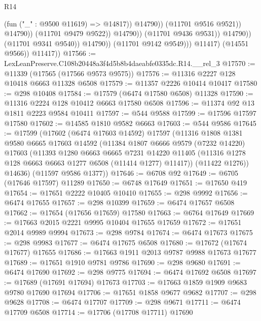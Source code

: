 \begin{lexlean}{R14}
\begin{coremodule}
                                              (fun ("_" : @9500 @11619) => @14817))
                                            @14790))
                                        (@11701 @9516 @9521))
                                      @14790))
                                  (@11701 @9479 @9522))
                                @14790))
                            (@11701 @9436 @9531))
                          @14790))
                      (@11701 @9341 @9540))
                    @14790))
                (@11701 @9142 @9549)))
            @11417)
          (@14551 @9566))
        @11417))
@17566 := LexLeanPreserve.C108b20448a3f4d5b8b4daeabfe0335dc.R14.__rel_3
@17570 := @11339 (@17565 (@17566 @9573 @9575))
@17576 := @11316 @2227 @128 @10418 @6663 @11328 @6508
@17579 := @11357 @2226 @10414 @10417
@17580 := @298 @10408
@17584 := @17579 (@6474 @17580 @6508) @11328
@17590 := @11316 @2224 @128 @10412 @6663 @17580 @6508
@17596 := @11374 @92 @13 @1811 @2223 @9584 @10411
@17597 := @544 @9588
@17599 := @17596 @17597 @17580
@17602 := @14585 @1810 @9582 @6663
@17603 := @544 @9586
@17645 := @17599
    (@17602
      (@6474 @17603 @14592)
      @17597
      (@11316
        @1808
        @1381
        @9580
        @6665
        @17603
        @14592
        (@11384
          @1807
          @6666
          @9579
          (@7232 @14220)
          @17603
          (@11393
            @1280
            @6663
            @6665
            @7231
            @14220
            @11405
            (@11316 @1278 @128 @6663 @6663 @1277 @6508 (@11414 @1277) @11417))
          (@11422 @1276))
        @14636)
      (@11597 @9586 @1377))
@17646 := @6708 @92
@17649 := @6705 (@17646 @17597) @11289
@17650 := @6748 @17649
@17651 := @17650 @419
@17654 := @17651 @2222 @10405 @10410
@17655 := @298 @9992
@17656 := @6474 @17655
@17657 := @298 @10399
@17659 := @6474 @17657 @6508
@17662 := @17654 (@17656 @17659) @17580
@17663 := @6764 @17649
@17669 := @17663 @2015 @2221 @9995 @10404 @17655 @17659
@17672 := @17651 @2014 @9989 @9994
@17673 := @298 @9784
@17674 := @6474 @17673
@17675 := @298 @9983
@17677 := @6474 @17675 @6508
@17680 := @17672 (@17674 @17677) @17655
@17686 := @17663 @1911 @2013 @9787 @9988 @17673 @17677
@17689 := @17651 @1910 @9781 @9786
@17690 := @298 @9680
@17691 := @6474 @17690
@17692 := @298 @9775
@17694 := @6474 @17692 @6508
@17697 := @17689 (@17691 @17694) @17673
@17703 := @17663 @1859 @1909 @9683 @9780 @17690 @17694
@17706 := @17651 @1858 @9677 @9682
@17707 := @298 @9628
@17708 := @6474 @17707
@17709 := @298 @9671
@17711 := @6474 @17709 @6508
@17714 := @17706 (@17708 @17711) @17690

\end{coremodule}
\end{lexlean}
